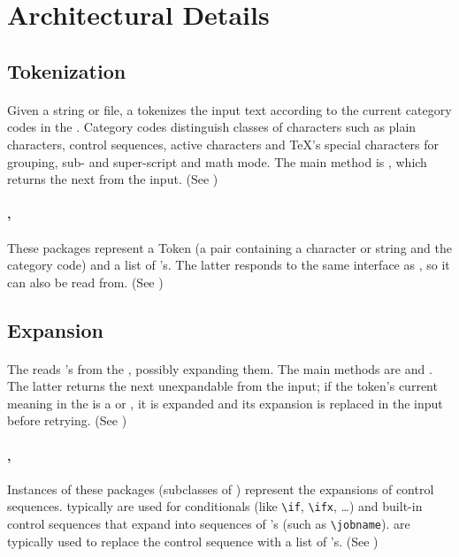 \documentclass{article}
\begin{document}
\appendix
\section{Architectural Details}\label{app:architecture}
\subsection{Tokenization}

\paragraph{}
Given a string or file, a  tokenizes the input text according to
the current category codes in the . Category codes distinguish classes of characters
such as plain characters, control sequences,  active characters and \TeX's special characters  
for grouping,  sub- and super-script and math mode.  The main method is , which
returns the next  from the input.
(See )

\paragraph{, } These packages represent a Token (a pair containing a character
or string and the category code) and a list of 's.  The latter responds to the same
interface as , so it can also be read from.
(See )

\subsection{Expansion}

\paragraph{}
The  reads 's from the , possibly expanding them.
The main methods are  and  .
The latter returns the next unexpandable  from the input;
if the token's current meaning in the  is a  or ,
it is expanded and its expansion is replaced in the input before retrying.
(See )

\paragraph{, } Instances of these packages (subclasses of )
represent the expansions of control sequences.  typically are used for
conditionals (like \verb|\if|, \verb|\ifx|, \ldots) and built-in control sequences that expand 
into sequences of 's (such as \verb|\jobname|).   are typically used
to replace the control sequence with a list of 's.
(See )
\end{document}
